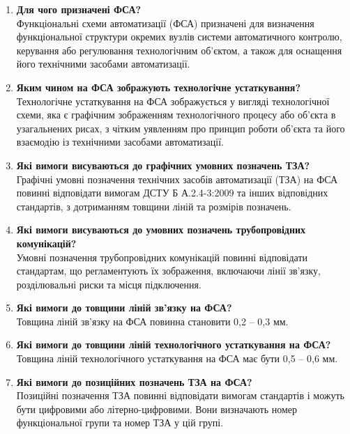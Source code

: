 \documentclass[a4paper]{article}
\begin{document}
\begin{enumerate}
    \item \textbf{Для чого призначені ФСА?}\\
    Функціональні схеми автоматизації (ФСА) призначені для визначення функціональної структури окремих вузлів системи автоматичного контролю, керування або регулювання технологічним об'єктом, а також для оснащення його технічними засобами автоматизації.
    \item \textbf{Яким чином на ФСА зображують технологічне устаткування?}\\
    Технологічне устаткування на ФСА зображується у вигляді технологічної схеми, яка є графічним зображенням технологічного процесу або об'єкта в узагальнених рисах, з чітким уявленням про принцип роботи об'єкта та його взаємодію із технічними засобами автоматизації.
    \item \textbf{Які вимоги висуваються до графічних умовних позначень ТЗА?}\\
    Графічні умовні позначення технічних засобів автоматизації (ТЗА) на ФСА повинні відповідати вимогам ДСТУ Б А.2.4-3:2009 та інших відповідних стандартів, з дотриманням товщини ліній та розмірів позначень.
    \item \textbf{Які вимоги висуваються до умовних позначень трубопровідних комунікацій?}\\
    Умовні позначення трубопровідних комунікацій повинні відповідати стандартам, що регламентують їх зображення, включаючи лінії зв'язку, розділювальні риски та місця підключення.
    \item \textbf{Які вимоги до товщини ліній зв’язку на ФСА?}\\
    Товщина ліній зв'язку на ФСА повинна становити 0,2 – 0,3 мм.
    \item \textbf{Які вимоги до товщини ліній технологічного устаткування на ФСА?}\\
    Товщина ліній технологічного устаткування на ФСА має бути 0,5 – 0,6 мм.
    \item \textbf{Які вимоги до позиційних позначень ТЗА на ФСА?}\\
    Позиційні позначення ТЗА повинні відповідати вимогам стандартів і можуть бути цифровими або літерно-цифровими. Вони визначають номер функціональної групи та номер ТЗА у цій групі.
\end{enumerate}
\end{document}
